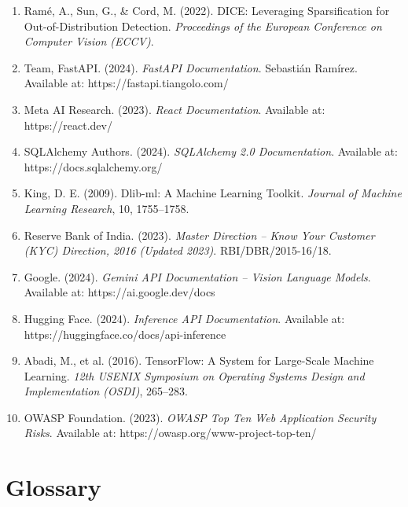 \begin{enumerate}
    \item Ramé, A., Sun, G., \& Cord, M. (2022). DICE: Leveraging Sparsification for Out-of-Distribution Detection. \textit{Proceedings of the European Conference on Computer Vision (ECCV)}.

    \item Team, FastAPI. (2024). \textit{FastAPI Documentation}. Sebastián Ramírez. Available at: https://fastapi.tiangolo.com/

    \item Meta AI Research. (2023). \textit{React Documentation}. Available at: https://react.dev/

    \item SQLAlchemy Authors. (2024). \textit{SQLAlchemy 2.0 Documentation}. Available at: https://docs.sqlalchemy.org/

    \item King, D. E. (2009). Dlib-ml: A Machine Learning Toolkit. \textit{Journal of Machine Learning Research}, 10, 1755--1758.

    \item Reserve Bank of India. (2023). \textit{Master Direction -- Know Your Customer (KYC) Direction, 2016 (Updated 2023)}. RBI/DBR/2015-16/18.

    \item Google. (2024). \textit{Gemini API Documentation -- Vision Language Models}. Available at: https://ai.google.dev/docs

    \item Hugging Face. (2024). \textit{Inference API Documentation}. Available at: https://huggingface.co/docs/api-inference

    \item Abadi, M., et al. (2016). TensorFlow: A System for Large-Scale Machine Learning. \textit{12th USENIX Symposium on Operating Systems Design and Implementation (OSDI)}, 265--283.

    \item OWASP Foundation. (2023). \textit{OWASP Top Ten Web Application Security Risks}. Available at: https://owasp.org/www-project-top-ten/
\end{enumerate}

\chapter*{Glossary}


